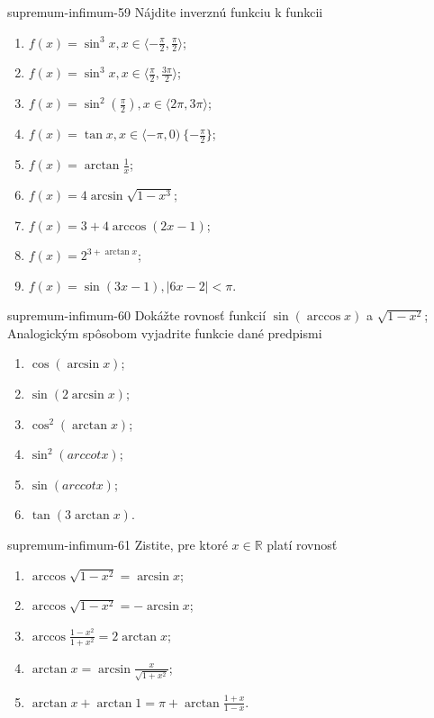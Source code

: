 \begin{defproblem}{supremum-infimum-59}
Nájdite inverznú funkciu k funkcii
\begin{multicols}{2}
\begin{enumerate}
    \item $f(x)=\sin^3 x,x\in\langle-\frac{\pi}{2},\frac{\pi}{2}\rangle$;
    \item $f(x)=\sin^3 x,x\in\langle\frac{\pi}{2},\frac{3\pi}{2}\rangle$;
    \item $f(x)=\sin^2 (\frac{\pi}{2}),x\in\langle 2\pi,3\pi \rangle$;
    \item $f(x)=\tan x,x\in\langle -\pi,0)\ \{-\frac{\pi}{2}\}$;
    \item $f(x)=\arctan\frac{1}{x}$;
    \item $f(x)=4\arcsin\sqrt{1-x^3}$;
    \item $f(x)=3+4\arccos(2x-1)$;
    \item $f(x)=2^{3+\arctan x}$;
    \item $f(x)=\sin (3x-1),|6x-2|<\pi$.
\end{enumerate}
\end{multicols}
\end{defproblem}

\begin{defproblem}{supremum-infimum-60}
Dokážte rovnosť funkcií $\sin(\arccos x)$ a $\sqrt{1-x^2}$; Analogickým spôsobom vyjadrite funkcie dané predpismi
\begin{multicols}{2}
\begin{enumerate}
    \item $\cos(\arcsin x)$;
    \item $\sin(2\arcsin x)$;
    \item $\cos^2 (\arctan x)$;
    \item $\sin^2 (arccot x)$;
    \item $\sin (arccot x)$;
    \item $\tan (3\arctan x)$.
\end{enumerate}
\end{multicols}
\end{defproblem}

\begin{defproblem}{supremum-infimum-61}
Zistite, pre ktoré $x\in\mathbb{R}$ platí rovnosť
\begin{multicols}{2}
\begin{enumerate}
    \item $\arccos\sqrt{1-x^2}=\arcsin x$;
    \item $\arccos\sqrt{1-x^2}=-\arcsin x$;
    \item $\arccos\frac{1-x^2}{1+x^2}=2\arctan x$;
    \item $\arctan x=\arcsin\frac{x}{\sqrt{1+x^2}}$;
    \item $\arctan x +\arctan 1 =\pi+ \arctan\frac{1+x}{1-x}$.
\end{enumerate}
\end{multicols}
\end{defproblem}

